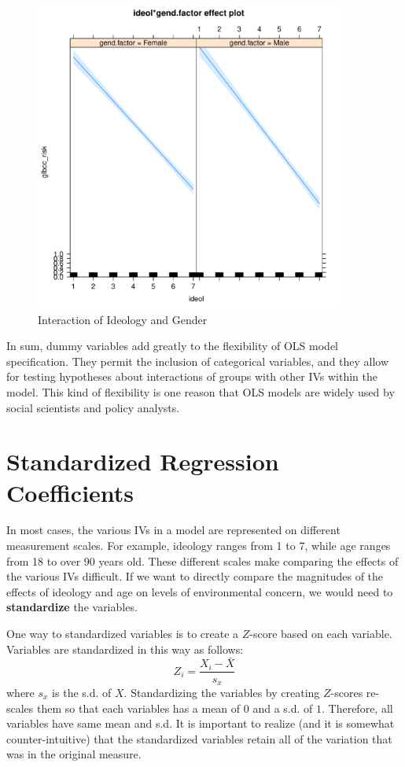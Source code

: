 \documentclass[11pt,openany]{book}\usepackage[]{graphicx}\usepackage[]{color}
\begin{document}
{\begin{figure}
  \centering
  \includegraphics[width=4in]{14_Topics/dummales.pdf}%
  \caption {Interaction of Ideology and Gender \label{fig:dummales}}
\end{figure}


In sum, dummy variables add greatly to the flexibility of OLS model specification. They permit the inclusion of categorical variables, and they allow for testing hypotheses about interactions  of groups with other IVs within the model. This kind of flexibility is one reason that OLS models are widely used by social scientists and policy analysts.

\section{Standardized Regression Coefficients} 

In most cases, the various IVs in a model are represented on different measurement scales. For example, ideology ranges from 1 to 7, while age ranges from 18 to over 90 years old. These different scales make comparing the effects of the various IVs difficult.  If we want to directly compare the magnitudes of the effects of ideology and age on levels of environmental concern, we would need to \textbf{standardize} the variables. 

One way to standardized variables is to create a $Z$-score based on each variable. Variables are standardized in this way as follows:
\begin{equation}
  Z_i = \frac{X_i-\bar{X}}{s_x} 
\end{equation}
\noindent where $s_x$ is the s.d. of $X$. Standardizing the variables by creating $Z$-scores re-scales them so that each variables has a mean of $0$ and a s.d. of $1$. Therefore, all variables have same mean and s.d. It is important to realize (and it is somewhat counter-intuitive) that the standardized variables retain all of the variation that was in the original measure.

}
\end{document}

